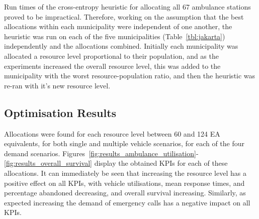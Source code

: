 \documentclass[preprint,12pt]{elsarticle}
\begin{document}
Run times of the cross-entropy heuristic for allocating all 67 ambulance stations proved to be impractical. Therefore, working on the assumption that the best allocations within each municipality were independent of one another, the heuristic was run on each of the five municipalities (Table~\ref{tbl:jakarta}) independently and the allocations combined. Initially each municipality was allocated a resource level proportional to their population, and as the experiments increased the overall resource level, this was added to the municipality with the worst resource-population ratio, and then the heuristic was re-ran with it's new resource level.

\subsection{Optimisation Results}\label{sec:optimisation_results}
Allocations were found for each resource level between 60 and 124 EA equivalents, for both single and multiple vehicle scenarios, for each of the four demand scenarios. Figures~\ref{fig:results_ambulance_utilisation}-\ref{fig:results_overall_survival} display the obtained KPIs for each of these allocations. It can immediately be seen that increasing the resource level has a positive effect on all KPIs, with vehicle utilisations, mean response times, and percentage abandoned decreasing, and overall survival increasing. Similarly, as expected increasing the demand of emergency calls has a negative impact on all KPIs.
\end{document}
